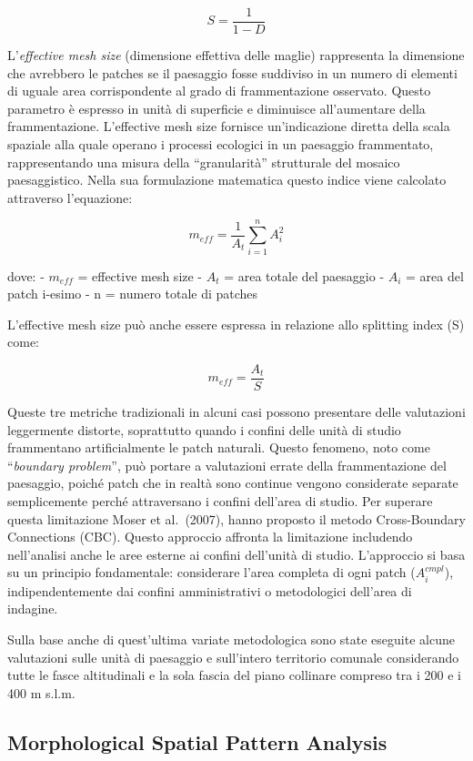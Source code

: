 \documentclass[
]{book}
\begin{document}
\[S=\frac{1}{1-D}\]

L'\emph{effective mesh size} (dimensione effettiva delle maglie) rappresenta la dimensione che avrebbero le patches se il paesaggio fosse suddiviso in un numero di elementi di uguale area corrispondente al grado di frammentazione osservato.
Questo parametro è espresso in unità di superficie e diminuisce all'aumentare della frammentazione.
L'effective mesh size fornisce un'indicazione diretta della scala spaziale alla quale operano i processi ecologici in un paesaggio frammentato, rappresentando una misura della ``granularità'' strutturale del mosaico paesaggistico.
Nella sua formulazione matematica questo indice viene calcolato attraverso l'equazione:

\[m_{eff} = \frac{1}{A_t} \sum_{i=1}^{n} A_i^2\]

dove: - \(m_{eff}\) = effective mesh size - \(A_t\) = area totale del paesaggio - \(A_i\) = area del patch i-esimo - n = numero totale di patches

L'effective mesh size può anche essere espressa in relazione allo splitting index (S) come:

\[m_{eff} = \frac{A_t}{S}\]

Queste tre metriche tradizionali in alcuni casi possono presentare delle valutazioni leggermente distorte, soprattutto quando i confini delle unità di studio frammentano artificialmente le patch naturali.
Questo fenomeno, noto come ``\emph{boundary problem}'', può portare a valutazioni errate della frammentazione del paesaggio, poiché patch che in realtà sono continue vengono considerate separate semplicemente perché attraversano i confini dell'area di studio.
Per superare questa limitazione Moser et al.~(2007), hanno proposto il metodo Cross-Boundary Connections (CBC).
Questo approccio affronta la limitazione includendo nell'analisi anche le aree esterne ai confini dell'unità di studio.
L'approccio si basa su un principio fondamentale: considerare l'area completa di ogni patch (\(A^{cmpl}_i\)), indipendentemente dai confini amministrativi o metodologici dell'area di indagine.

Sulla base anche di quest'ultima variate metodologica sono state eseguite alcune valutazioni sulle unità di paesaggio e sull'intero territorio comunale considerando tutte le fasce altitudinali e la sola fascia del piano collinare compreso tra i 200 e i 400 m s.l.m.

\subsection{Morphological Spatial Pattern Analysis}\label{morphological-spatial-pattern-analysis}
\end{document}
